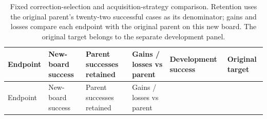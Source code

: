 \documentclass[10pt,letterpaper]{article}
\begin{document}
\begin{longtable}[]{@{}
  >{\raggedright\arraybackslash}p{}
  >{\raggedleft\arraybackslash}p{}
  >{\raggedleft\arraybackslash}p{}
  >{\raggedleft\arraybackslash}p{}
  >{\raggedleft\arraybackslash}p{}
  >{\raggedright\arraybackslash}p{}@{}}
\caption{Fixed correction-selection and acquisition-strategy comparison.
Retention uses the original parent's twenty-two successful cases as its
denominator; gains and losses compare each endpoint with the original
parent on this new board. The original target belongs to the
separate development panel.}\tabularnewline
\toprule\noalign{}
\begin{minipage}[b]{\linewidth}\raggedright
Endpoint
\end{minipage} & \begin{minipage}[b]{\linewidth}\raggedleft
New-board success
\end{minipage} & \begin{minipage}[b]{\linewidth}\raggedleft
Parent successes retained
\end{minipage} & \begin{minipage}[b]{\linewidth}\raggedleft
Gains / losses vs parent
\end{minipage} & \begin{minipage}[b]{\linewidth}\raggedleft
Development success
\end{minipage} & \begin{minipage}[b]{\linewidth}\raggedright
Original target
\end{minipage} \\
\midrule\noalign{}
\endfirsthead
\toprule\noalign{}
\begin{minipage}[b]{\linewidth}\raggedright
Endpoint
\end{minipage} & \begin{minipage}[b]{\linewidth}\raggedleft
New-board success
\end{minipage} & \begin{minipage}[b]{\linewidth}\raggedleft
Parent successes retained
\end{minipage} & \begin{minipage}[b]{\linewidth}\raggedleft
Gains / losses vs parent
\end{minipage} & \begin{minipage}[b]{\linewidth}\raggedleft

\end{minipage}
\end{longtable}
\end{document}
